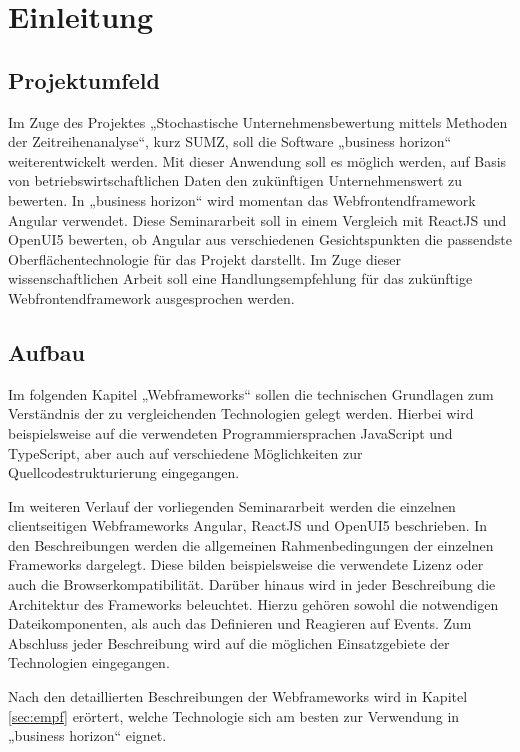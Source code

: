 
\chapter{Einleitung}

\section{Projektumfeld}

Im Zuge des Projektes „Stochastische Unternehmensbewertung mittels Methoden der Zeitreihenanalyse“, kurz SUMZ, soll die Software „business horizon“ weiterentwickelt werden. Mit dieser Anwendung soll es möglich werden, auf Basis von betriebswirtschaftlichen Daten den zukünftigen Unternehmenswert zu bewerten. In „business horizon“ wird momentan das Webfrontendframework Angular verwendet. Diese Seminararbeit soll in einem Vergleich mit ReactJS und OpenUI5 bewerten, ob Angular aus verschiedenen Gesichtspunkten die passendste Oberflächentechnologie für das Projekt darstellt. Im Zuge dieser wissenschaftlichen Arbeit soll eine Handlungsempfehlung für das zukünftige Webfrontendframework ausgesprochen werden.

\section{Aufbau}

Im folgenden Kapitel „Webframeworks“ sollen die technischen Grundlagen zum Verständnis der zu vergleichenden Technologien gelegt werden. Hierbei wird beispielsweise auf die verwendeten Programmiersprachen JavaScript und TypeScript, aber auch auf verschiedene Möglichkeiten zur Quellcodestrukturierung eingegangen. 

Im weiteren Verlauf der vorliegenden Seminararbeit werden die einzelnen clientseitigen Webframeworks Angular, ReactJS und OpenUI5 beschrieben. In den Beschreibungen werden die allgemeinen Rahmenbedingungen der einzelnen Frameworks dargelegt. Diese bilden beispielsweise die verwendete Lizenz oder auch die Browserkompatibilität. Darüber hinaus wird in jeder Beschreibung die Architektur des Frameworks beleuchtet. Hierzu gehören sowohl die notwendigen Dateikomponenten, als auch das Definieren und Reagieren auf Events. Zum Abschluss jeder Beschreibung wird auf die möglichen Einsatzgebiete der Technologien eingegangen.

Nach den detaillierten Beschreibungen der Webframeworks wird in Kapitel \ref{sec:empf} erörtert, welche Technologie sich am besten zur Verwendung in „business horizon“ eignet.
